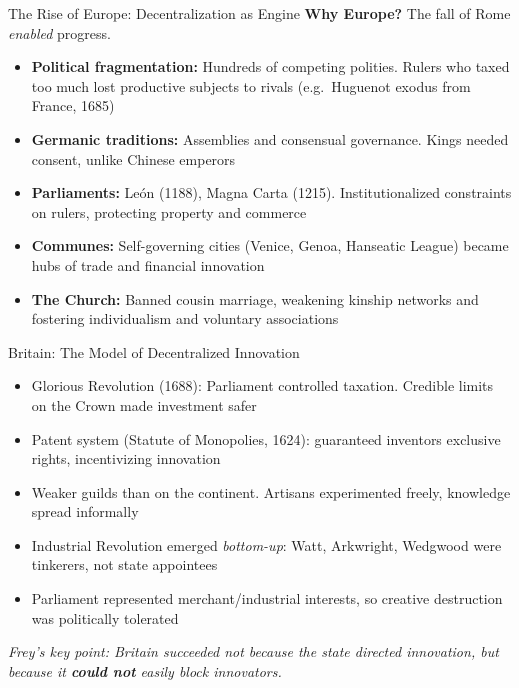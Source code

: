 \documentclass[aspectratio=169, 11pt]{beamer}
\begin{document}
\begin{frame}{The Rise of Europe: Decentralization as Engine}
    \textbf{Why Europe?} The fall of Rome \textit{enabled} progress.

    \vspace{0.5em}

    \begin{itemize}
        \item \textbf{Political fragmentation:} Hundreds of competing polities. Rulers who taxed too much lost productive subjects to rivals (e.g.\ Huguenot exodus from France, 1685)
        \item \textbf{Germanic traditions:} Assemblies and consensual governance. Kings needed consent, unlike Chinese emperors
        \item \textbf{Parliaments:} Le\'{o}n (1188), Magna Carta (1215). Institutionalized constraints on rulers, protecting property and commerce
        \item \textbf{Communes:} Self-governing cities (Venice, Genoa, Hanseatic League) became hubs of trade and financial innovation
        \item \textbf{The Church:} Banned cousin marriage, weakening kinship networks and fostering individualism and voluntary associations
    \end{itemize}
\end{frame}

\begin{frame}{Britain: The Model of Decentralized Innovation}
    \begin{itemize}
        \item Glorious Revolution (1688): Parliament controlled taxation. Credible limits on the Crown made investment safer
        \item Patent system (Statute of Monopolies, 1624): guaranteed inventors exclusive rights, incentivizing innovation
        \item Weaker guilds than on the continent. Artisans experimented freely, knowledge spread informally
        \item Industrial Revolution emerged \textit{bottom-up}: Watt, Arkwright, Wedgwood were tinkerers, not state appointees
        \item Parliament represented merchant/industrial interests, so creative destruction was politically tolerated
    \end{itemize}

    \vspace{0.5em}
    \begin{center}
        \textit{Frey's key point: Britain succeeded not because the state directed innovation, but because it \textbf{could not} easily block innovators.}
    \end{center}
\end{frame}
\end{document}
